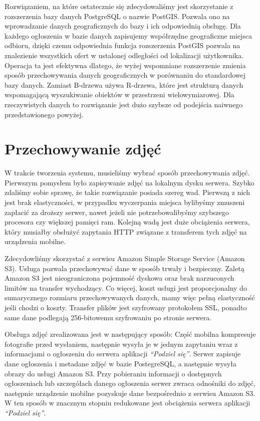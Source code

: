 \documentclass[licencjacka]{pracamgr}
\begin{document}
Rozwiązaniem, na które ostatecznie się zdecydowaliśmy jest skorzystanie z rozszerzenia bazy danych PostgreSQL o nazwie PostGIS. Pozwala ono na wprowadzanie danych geograficznych do bazy i ich odpowiednią obsługę. Dla każdego ogłoszenia w bazie danych zapisujemy współrzędne geograficzne miejsca odbioru, dzięki czemu odpowiednia funkcja rozszerzenia PostGIS pozwala na znalezienie wszystkich ofert w ustalonej odległości od lokalizacji użytkownika. Operacja ta jest efektywna dlatego, że wyżej wspomniane rozszerzenie zmienia sposób przechowywania danych geograficznych w porównaniu do standardowej bazy danych. Zamiast B-drzewa używa R-drzewa, które jest strukturą danych wspomagającą wyszukiwanie obiektów w przestrzeni wielowymiarowej. Dla rzeczywistych danych to rozwiązanie jest dużo szybsze od podejścia naiwnego przedstawionego powyżej.

\section{Przechowywanie zdjęć} 

W trakcie tworzenia systemu, musieliśmy wybrać sposób przechowywania zdjęć. Pierwszym pomysłem było zapisywanie zdjęć na lokalnym dysku serwera. Szybko zdaliśmy sobie sprawę, że takie rozwiązanie posiada szereg wad. Pierwszą z nich jest brak elastyczności, w przypadku wyczerpania miejsca bylibyśmy zmuszeni zapłacić za droższy serwer, nawet jeżeli nie potrzebowalibyśmy szybszego procesora czy większej pamięci ram. Kolejną wadą jest duże obciążenia serwera, który musiałby obsłużyć zapytania HTTP związane z transferem tych zdjęć na urządzenia mobilne. 

Zdecydowliśmy skorzystać z serwisu Amazon Simple Storage Service (Amazon S3). Usługa pozwala przechowywać dane w sposób trwały i bezpieczny. Zaletą Amazon S3 jest nieograniczona pojemność dyskowa oraz brak narzuconych limitów na transfer wychodzący. Co więcej, koszt usługi jest proporcjonalny do sumarycznego rozmiaru przechowywanych danych, mamy więc pełną elastyczność jeśli chodzi o koszty. Transfer plików jest szyfrowany protokołem SSL, ponadto same dane podlegają 256-bitowemu szyfrowaniu po stronie serwera.

Obsługa zdjęć zrealizowana jest w następujący sposób: Część mobilna kompresuje fotografie przed wysłaniem, następnie wysyła je w jednym zapytaniu wraz z informacjami o ogłoszeniu do serwera aplikacji \textit{``Podziel się''}. Serwer zapisuje dane ogłoszenia i metadane zdjęć w bazie PostegreSQL, a następnie wysyła obrazy do usługi Amazon S3. Przy pobieraniu informacji o dostępnych ogłoszeniach lub szczegółach danego ogłoszenia serwer zwraca odnośniki do zdjęć, następnie urządzenie mobilne pozyskuje dane bezpośrednio z serwisu Amazon S3. W ten sposób w znacznym stopniu redukowane jest obciążenia serwera aplikacji \textit{``Podziel się''}.
\end{document}
